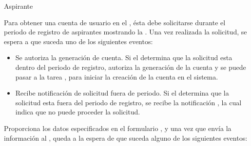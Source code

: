 \begin{PDescripcion}

  \Ppaso Aspirante

    \begin{enumerate}

      \Ppaso[\itarea]  Para obtener una cuenta de usuario en el , ésta debe solicitarse durante el periodo de registro de aspirantes mostrando la . Una vez realizada la solicitud, se espera a que suceda uno de los siguientes eventos:

	\begin{itemize}
	  \item Se autoriza la generación de cuenta. Si el  determina que la solicitud esta dentro del periodo de registro, autoriza la generación de la cuenta y se puede pasar a la tarea , para iniciar la creación de la cuenta en el sistema.
	  \item Recibe notificación de solicitud fuera de periodo. Si el  determina que la solicitud esta fuera del periodo de registro, se recibe la notificación , la cual indica que no puede proceder la solicitud.
	\end{itemize}

      \Ppaso[\itarea]  Proporciona los datos  especificados en el formulario , y una vez que envía la información al , queda a la espera de que suceda alguno de los siguientes eventos:


\end{enumerate}
\end{PDescripcion}
